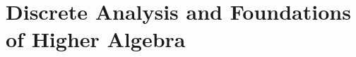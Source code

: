 \documentclass[../../book-en.tex]{subfiles}
\begin{document}
\chapter{Discrete Analysis and Foundations of Higher Algebra}
\label{ch:2.2-discrete-algebra-en}
















\end{document}
